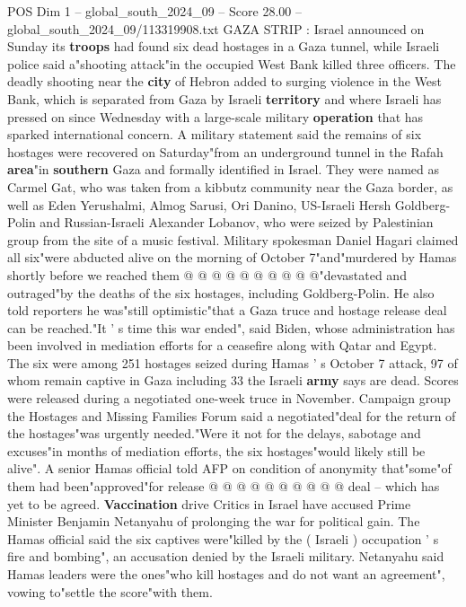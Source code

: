 \begin{textsample}{POS Dim 1 – global\_south\_2024\_09 – Score 28.00 – global\_south\_2024\_09/113319908.txt}  \label{ex:f1_pos_207}
GAZA STRIP : Israel announced on Sunday its \textbf{troops} had found six dead hostages in a Gaza tunnel, while Israeli police said a"shooting attack"in the occupied West Bank killed three officers.
The deadly shooting near the \textbf{city} of Hebron added to surging violence in the West Bank, which is separated from Gaza by Israeli \textbf{territory} and where Israeli has pressed on since Wednesday with a large-scale military \textbf{operation} that has sparked international concern.
A military statement said the remains of six hostages were recovered on Saturday"from an underground tunnel in the Rafah \textbf{area}"in \textbf{southern} Gaza and formally identified in Israel.
They were named as Carmel Gat, who was taken from a kibbutz community near the Gaza border, as well as Eden Yerushalmi, Almog Sarusi, Ori Danino, US-Israeli Hersh Goldberg-Polin and Russian-Israeli Alexander Lobanov, who were seized by Palestinian group from the site of a music festival.
Military spokesman Daniel Hagari claimed all six"were abducted alive on the morning of October 7"and"murdered by Hamas shortly before we reached them @ @ @ @ @ @ @ @ @ @"devastated and outraged"by the deaths of the six hostages, including Goldberg-Polin.
He also told reporters he was"still optimistic"that a Gaza truce and hostage release deal can be reached."It ' s time this war ended", said Biden, whose administration has been involved in mediation efforts for a ceasefire along with Qatar and Egypt.
The six were among 251 hostages seized during Hamas ' s October 7 attack, 97 of whom remain captive in Gaza including 33 the Israeli \textbf{army} says are dead.
Scores were released during a negotiated one-week truce in November.
Campaign group the Hostages and Missing Families Forum said a negotiated"deal for the return of the hostages"was urgently needed."Were it not for the delays, sabotage and excuses"in months of mediation efforts, the six hostages"would likely still be alive".
A senior Hamas official told AFP on condition of anonymity that"some"of them had been"approved"for release @ @ @ @ @ @ @ @ @ @ deal -- which has yet to be agreed. \textbf{Vaccination} drive Critics in Israel have accused Prime Minister Benjamin Netanyahu of prolonging the war for political gain.
The Hamas official said the six captives were"killed by the ( Israeli ) occupation ' s fire and bombing", an accusation denied by the Israeli military.
Netanyahu said Hamas leaders were the ones"who kill hostages and do not want an agreement", vowing to"settle the score"with them.

\end{textsample}
